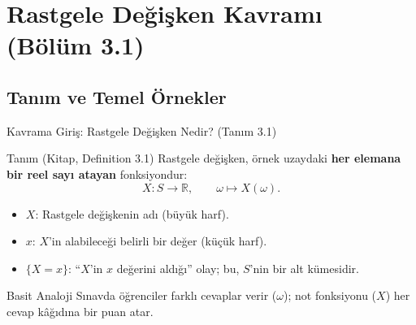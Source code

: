 ﻿\documentclass[light]{lutbeamer}
\begin{document}
\section{Rastgele Değişken Kavramı (Bölüm 3.1)}
\subsection{Tanım ve Temel Örnekler}

\begin{frame}{Kavrama Giriş: Rastgele Değişken Nedir? (Tanım 3.1)}
    \begin{block}{Tanım (Kitap, Definition 3.1)}
        Rastgele değişken, örnek uzaydaki \textbf{her elemana bir reel sayı atayan} fonksiyondur:
        \[
        X : S \to \mathbb{R}, \qquad \omega \mapsto X(\omega).
        \]
    \end{block}

    \begin{itemize}
        \item $X$: Rastgele değişkenin adı (büyük harf).
        \item $x$: $X$'in alabileceği belirli bir değer (küçük harf).
        \item $\{X = x\}$: ``$X$'in $x$ değerini aldığı'' olay; bu, $S$'nin bir alt kümesidir.
    \end{itemize}

    \begin{exampleblock}{Basit Analoji}
      Sınavda öğrenciler farklı cevaplar verir ($\omega$); not fonksiyonu ($X$) her cevap kâğıdına bir puan atar.
    \end{exampleblock}
\end{frame}
\end{document}
